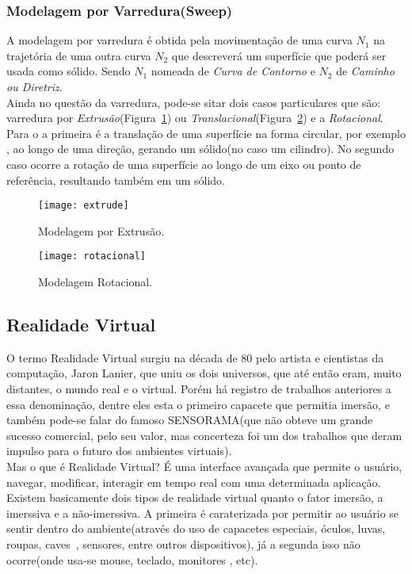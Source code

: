 \subsubsection{Modelagem por Varredura(Sweep)}
A modelagem por varredura é obtida pela movimentação de uma curva $N_1$ na trajetória de uma outra curva $N_2$ que descreverá um superfície que poderá ser usada como sólido. Sendo $N_1$ nomeada de \textit{Curva de Contorno} e $N_2$ de \textit{Caminho ou Diretriz}\cite{3dsmod}.\\

Ainda no questão da varredura, pode-se sitar dois casos particulares que são: varredura por \textit{Extrusão}(Figura~\ref{fg:etrusao}) ou \textit{Translacional}(Figura~\ref{fg:rotacional}) e a \textit{Rotacional}. Para o a primeira é a translação de uma superfície na forma circular, por exemplo , ao longo de uma direção, gerando um sólido(no caso um cilindro). No segundo caso ocorre a rotação de uma superfície ao longo de um eixo ou ponto de referência, resultando também em um sólido.

\begin{figure}[ht!]
      \centering
	  \texttt{[image: extrude]}
	  \caption{Modelagem por Extrusão.}
	  \label{fg:etrusao}
\end{figure} 
\begin{figure}[ht!]
      \centering
	  \texttt{[image: rotacional]}
	  \caption{Modelagem Rotacional.}
	  \label{fg:rotacional}
\end{figure} 

\subsection{Realidade Virtual}
O termo Realidade Virtual surgiu na década de 80 pelo artista e cientistas da computação, Jaron Lanier, que uniu os dois universos, que até então eram, muito distantes, o mundo real e o virtual\cite{jane}. Porém há registro de trabalhos anteriores a essa denominação, dentre eles esta o primeiro capacete que permitia imersão, e também pode-se falar do famoso SENSORAMA\cite{rhen}(que não obteve um grande sucesso comercial, pelo seu valor, mas concerteza foi um dos trabalhos que deram impulso para o futuro dos ambientes virtuais).\\

Mas o que é Realidade Virtual? É uma interface avançada que permite o usuário, navegar, modificar, interagir em tempo real com uma determinada aplicação. Existem basicamente dois tipos de realidade virtual quanto o fator imersão, a imerssiva e a não-imerssiva. A primeira é caraterizada por permitir ao usuário se sentir dentro do ambiente(através do uso de capacetes especiais, óculos, luvas, roupas, caves~\cite{cave}, sensores, entre outros dispositivos), já a segunda isso não ocorre(onde usa-se mouse, teclado, monitores , etc)\cite{aect}.

